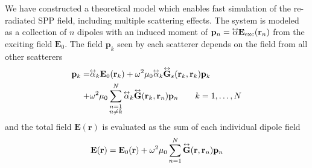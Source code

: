 We have constructed a theoretical model which enables fast simulation of
the re-radiated SPP field, including multiple scattering effects. The
system is modeled as a collection of $n$ dipoles with an induced moment of
$\mathbf{p}_n=\tensor{\alpha} \mathbf{E}_\mathrm{exc}(\mathbf{r}_n)$
from the exciting field $\mathbf{E}_0$. The field $\mathbf{p}_k$ seen by
each scatterer depends on the field from all other scatterers
\begin{align}
\mathbf{p}_k =& \tensor{\alpha}_k \mathbf{E}_0(\mathbf{r}_k)
+\omega^2 \mu_0 \tensor{\alpha}_k \tensor{\mathbf{G}}_s(\mathbf{r}_k,\mathbf{r}_k)\mathbf{p}_k\\
+& \omega^2\mu_0 \sum_{\substack{n=1\\n \ne k}}^N
\tensor{\alpha}_k
\tensor{\mathbf{G}}(\mathbf{r}_k,\mathbf{r}_n)\mathbf{p}_n\qquad k=1,\ldots,N
\end{align}
and the total field $\mathbf{E}(\mathbf{r})$ is evaluated as the sum of each individual dipole field
\begin{equation}
\mathbf{E}(\mathbf{r}) = \mathbf{E}_0(\mathbf{r}) + \omega^2 \mu_0
\sum_{n=1}^{N} \tensor{\mathbf{G}}(\mathbf{r},\mathbf{r}_n) \mathbf{p}_n
\end{equation}

